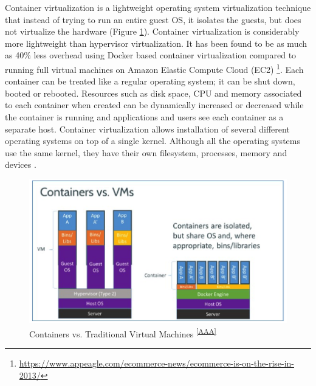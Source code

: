 \documentclass[a4paper,11pt,twoside]{article}
\begin{document}
\noindent
Container virtualization is a lightweight operating system virtualization technique that instead of trying to run an entire guest OS, it isolates the guests, but does not virtualize the hardware  \cite{container} (Figure \ref{vm vs container}). Container virtualization is considerably more lightweight than hypervisor virtualization. It has been found to be as much as 40\% less overhead using Docker based container virtualization compared to running full virtual machines on Amazon Elastic Compute Cloud (EC2) \footnote{\url{https://www.appeagle.com/ecommerce-news/ecommerce-is-on-the-rise-in-2013/}}. Each container can be treated like a regular operating system; it can be shut down, booted or rebooted. Resources such as disk space, CPU and memory associated to each container when created can be dynamically increased or decreased while the container is running and applications and users see each container as a separate host. Container virtualization allows installation of several different operating systems on top of a single kernel. Although all the operating systems use the same kernel, they have their own filesystem, processes, memory and devices \cite{container}. \\


\begin{figure}[!ht]
  \centering
     \includegraphics[scale=1]{containervsvm}
  \caption{Containers vs. Traditional Virtual Machines \textsuperscript{\ref{AAA}}}%
  \label{vm vs container}  
\end{figure}
\vspace{-18pt}

\end{document}
